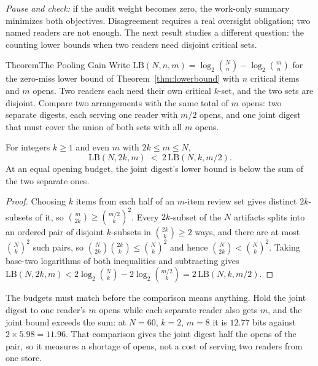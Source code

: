 \documentclass[11pt,a4paper]{article}
\theoremstyle{definition}
\theoremstyle{plain}
\begin{document}
\emph{Pause and check:} if the audit weight becomes zero, the work-only summary minimizes both objectives. Disagreement requires a real oversight obligation; two named readers are not enough. The next result studies a different question: the counting lower bounds when two readers need disjoint critical sets.

\begin{pdclaim}{Theorem}{The Pooling Gain}
\setlength{\parskip}{4pt plus 1pt}
\label{thm:pooling-gain}
Write $\mathrm{LB}(N,n,m)=\log_2\binom Nn-\log_2\binom mn$ for the zero-miss
lower bound of Theorem~\ref{thm:lowerbound} with $n$ critical items and $m$
opens. Two readers each need their own critical $k$-set, and the two sets are
disjoint. Compare two arrangements with the same total of $m$ opens: two
separate digests, each serving one reader with $m/2$ opens, and one joint
digest that must cover the union of both sets with all $m$ opens.

For integers $k\ge1$ and even $m$ with $2k\le m\le N$,
\[
\mathrm{LB}(N,2k,m)\;<\;2\,\mathrm{LB}(N,k,m/2).
\]
At an equal opening budget, the joint digest's lower bound is below the sum of
the two separate ones.
\end{pdclaim}

\begin{proof}
\setlength{\parskip}{4pt plus 1pt}
Choosing $k$ items from each half of an $m$-item review set gives distinct
$2k$-subsets of it, so $\binom m{2k}\ge\binom{m/2}k^2$. Every $2k$-subset of
the $N$ artifacts splits into an ordered pair of disjoint $k$-subsets in
$\binom{2k}k\ge2$ ways, and there are at most $\binom Nk^2$ such pairs, so
$\binom N{2k}\binom{2k}k\le\binom Nk^2$ and hence $\binom N{2k}<\binom Nk^2$.
Taking base-two logarithms of both inequalities and subtracting gives
$\mathrm{LB}(N,2k,m)<2\log_2\binom Nk-2\log_2\binom{m/2}k=2\,\mathrm{LB}(N,k,m/2)$.
\end{proof}

\noindent The budgets must match before the comparison means anything. Hold
the joint digest to one reader's $m$ opens while each separate reader also
gets $m$, and the joint bound exceeds the sum: at $N=60$, $k=2$, $m=8$ it is
$12.77$ bits against $2\times5.98=11.96$. That comparison gives the joint
digest half the opens of the pair, so it measures a shortage of opens, not a
cost of serving two readers from one store.
\end{document}
